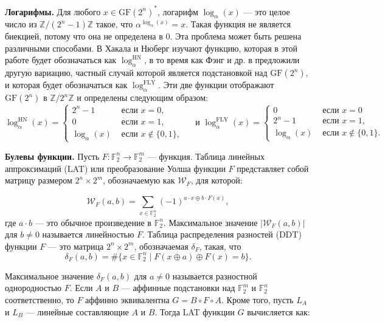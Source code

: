 \textbf{Логарифмы.} Для любого \(x \in \text{GF}(2^n)^*\), логарифм \(\log_\alpha(x)\) — это целое число из \(\mathbb{Z}/(2^n - 1)\mathbb{Z}\) такое, что \(\alpha^{\log_\alpha(x)} = x\). Такая функция не является биекцией, потому что она не определена в 0. Эта проблема может быть решена различными способами. В \cite{HN10} Хакала и Нюберг изучают функцию, которая в этой работе будет обозначаться как \(\log_{\alpha}^{\text{HN}}\), в то время как Фэнг и др. в \cite{FLY09} предложили другую вариацию, частный случай которой является подстановкой над \(\text{GF}(2^n)\), и которая будет обозначаться как \(\log_{\alpha}^{\text{FLY}}\). Эти две функции отображают \(\text{GF}(2^n)\) в \(\mathbb{Z}/2^n\mathbb{Z}\) и определены следующим образом:
$$
\log _\alpha^{\mathrm{HN}}(x)=\left\{\begin{array}{ll}
        2^n-1 & \text { если } x=0, \\
        0 & \text { если } x=1, \\
        \log _\alpha(x) & \text { если } x \notin\{0,1\},
        \end{array} \quad \text { и } \log _\alpha^{\mathrm{FLY}}(x)= \begin{cases}0 & \text { если } x=0 \\
        2^n-1 & \text { если } x=1, \\
        \log _\alpha(x) & \text { если } x \notin\{0,1\} .\end{cases}\right.
$$

\textbf{Булевы функции.} Пусть \( F : \mathbb{F}_2^n \rightarrow \mathbb{F}_2^m \) — функция. Таблица линейных аппроксимаций (LAT) или преобразование Уолша функции \( F \) представляет собой матрицу размером \( 2^n \times 2^m \), обозначаемую как \( \mathcal{W}_F \), для которой:

\[
\mathcal{W}_F(a, b) = \sum_{x \in \mathbb{F}_2^n} (-1)^{a \cdot x \oplus b \cdot F(x)},
\] где \( a \cdot b \) — это обычное произведение в \(\mathbb{F}_2^n\). Максимальное значение \(|\mathcal{W}_F(a, b)|\) для \(b \neq 0\) называется линейностью \( F \). Таблица распределения разностей (DDT) функции \( F \) — это матрица \( 2^n \times 2^m \), обозначаемая \(\delta_F\), такая, что
\[
\delta_F(a, b) = \# \{ x \in \mathbb{F}_2^n \mid F(x \oplus a) \oplus F(x) = b \}.
\]

Максимальное значение \(\delta_F(a, b)\) для \(a \neq 0\) называется разностной однородностью \( F \). Если \( A \) и \( B \) — аффинные подстановки над \(\mathbb{F}_2^m\) и \(\mathbb{F}_2^n\) соответственно, то \( F \) аффинно эквивалентна \( G = B \circ F \circ A \). Кроме того, пусть \( L_A \) и \( L_B \) — линейные составляющие \( A \) и \( B \). Тогда LAT функции \( G \) вычисляется как:

